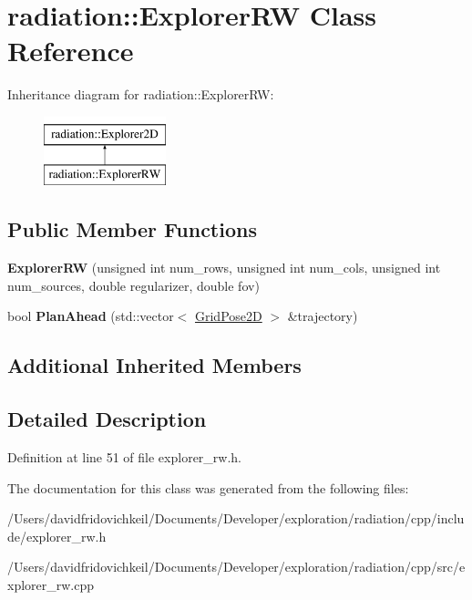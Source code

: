 \hypertarget{classradiation_1_1_explorer_r_w}{}\section{radiation\+:\+:Explorer\+RW Class Reference}
\label{classradiation_1_1_explorer_r_w}
Inheritance diagram for radiation\+:\+:Explorer\+RW\+:\begin{figure}[H]
\begin{center}
\leavevmode
\includegraphics[height=2.000000cm]{classradiation_1_1_explorer_r_w}
\end{center}
\end{figure}
\subsection*{Public Member Functions}
\begin{DoxyCompactItemize}
\item 
\hypertarget{classradiation_1_1_explorer_r_w_a89a7d007495d2ac43f5863c59b25a97f}{}\label{classradiation_1_1_explorer_r_w_a89a7d007495d2ac43f5863c59b25a97f} 
{\bfseries Explorer\+RW} (unsigned int num\+\_\+rows, unsigned int num\+\_\+cols, unsigned int num\+\_\+sources, double regularizer, double fov)
\item 
\hypertarget{classradiation_1_1_explorer_r_w_a30e8acd62a435a5d424553412f219379}{}\label{classradiation_1_1_explorer_r_w_a30e8acd62a435a5d424553412f219379} 
bool {\bfseries Plan\+Ahead} (std\+::vector$<$ \hyperlink{classradiation_1_1_grid_pose2_d}{Grid\+Pose2D} $>$ \&trajectory)
\end{DoxyCompactItemize}
\subsection*{Additional Inherited Members}


\subsection{Detailed Description}


Definition at line 51 of file explorer\+\_\+rw.\+h.



The documentation for this class was generated from the following files\+:\begin{DoxyCompactItemize}
\item 
/\+Users/davidfridovichkeil/\+Documents/\+Developer/exploration/radiation/cpp/include/explorer\+\_\+rw.\+h\item 
/\+Users/davidfridovichkeil/\+Documents/\+Developer/exploration/radiation/cpp/src/explorer\+\_\+rw.\+cpp\end{DoxyCompactItemize}
